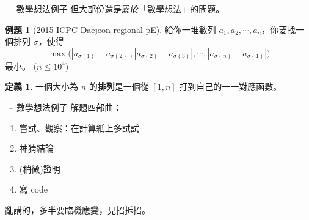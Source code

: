 \documentclass[notheorems,xcolor=dvipsnames]{beamer}
\newcommand\abs[1]{\left\lvert #1 \right\rvert}
\theoremstyle{definition}
\newtheorem{problem}{例題}
\newtheorem{definition}{定義}
\renewcommand*{\emph}[1]{{\bf #1}}
\begin{document}
\begin{frame}[t]{\secname \ -- 數學想法例子}
  但大部份還是屬於「數學想法」的問題。

  \pause
  \medskip
  \begin{problem}[2015 ICPC Daejeon regional pE]
    給你一堆數列 $a_1, a_2, \cdots, a_n$，你要找一個排列 $\sigma$，使得
    \[ \max \Big(
      \abs{a_{\sigma(1)} - a_{\sigma(2)}},
      \abs{a_{\sigma(2)} - a_{\sigma(3)}}, \cdots,
      \abs{a_{\sigma(n)} - a_{\sigma(1)}}
      \Big) \]
    最小。 ($n \leq 10^4$)
  \end{problem}

  \pause
  \begin{definition}
    一個大小為 $n$ 的\emph{排列}是一個從 $[1, n]$ 打到自己的一一對應函數。
  \end{definition}
\end{frame}

\begin{frame}[t]{\secname \ -- 數學想法例子}
  解題四部曲：
  \pause

  \begin{enumerate}[<+->]
    \item 嘗試、觀察：在計算紙上多試試
    \item 神猜結論
    \item {\color{gray} (稍微)}證明
    \item 寫 code
  \end{enumerate}
  \pause

  \bigskip
  亂講的，多半要臨機應變，見招拆招。
\end{frame}
\end{document}
